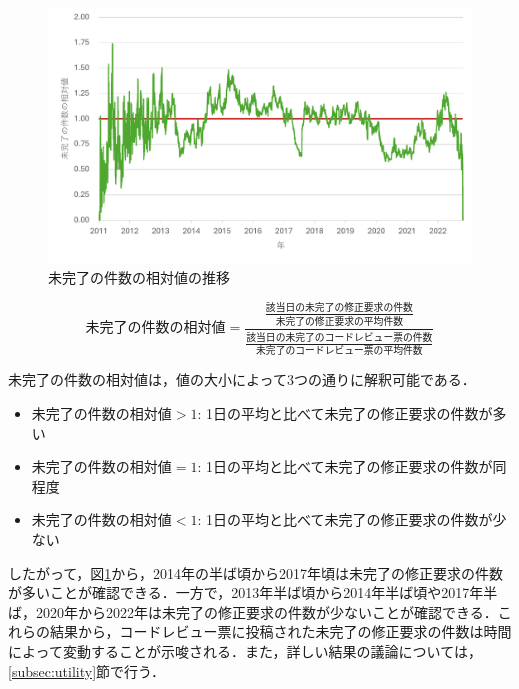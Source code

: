 \documentclass[11pt]{jreport}
\begin{document}
\begin{figure}[t]
\centerline{\includegraphics[width=1.0\linewidth]{@BSthesis2024_Kawasaki/BSthesis2024_Kawasaki_fig/request_per_pr.pdf}}
\caption{未完了の件数の相対値の推移}
\label{fig:request_per_pr}
\end{figure}

\begin{equation}
未完了の件数の相対値 = \frac{\frac{該当日の未完了の修正要求の件数}{未完了の修正要求の平均件数}}{\frac{該当日の未完了のコードレビュー票の件数}{未完了のコードレビュー票の平均件数}} \label{formula:relative}
\end{equation}

未完了の件数の相対値は，値の大小によって3つの通りに解釈可能である．

\begin{itemize}
\item $未完了の件数の相対値 > 1$: 1日の平均と比べて未完了の修正要求の件数が多い
\item $未完了の件数の相対値 = 1$: 1日の平均と比べて未完了の修正要求の件数が同程度
\item $未完了の件数の相対値 < 1$: 1日の平均と比べて未完了の修正要求の件数が少ない
\end{itemize}

したがって，図\ref{fig:request_per_pr}から，2014年の半ば頃から2017年頃は未完了の修正要求の件数が多いことが確認できる．一方で，2013年半ば頃から2014年半ば頃や2017年半ば，2020年から2022年は未完了の修正要求の件数が少ないことが確認できる．これらの結果から，コードレビュー票に投稿された未完了の修正要求の件数は時間によって変動することが示唆される．また，詳しい結果の議論については，\ref{subsec:utility}節で行う．
\end{document}
